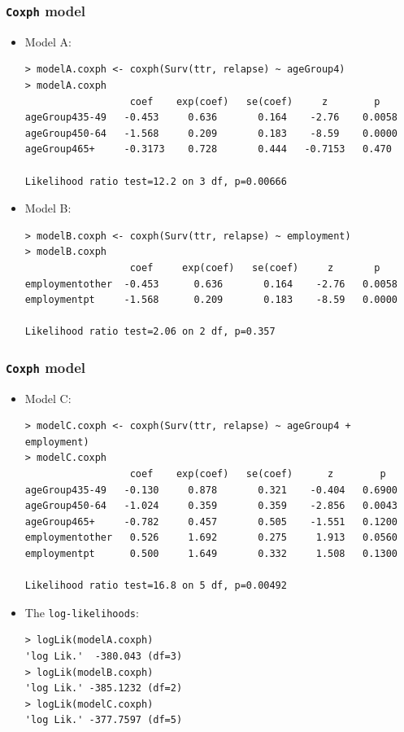 \documentclass{beamer}
\begin{document}
\pagebreak
\begin{frame}[fragile]
\frametitle{\texttt{Coxph} model}	
\begin{itemize}
\item Model A:
\begin{Verbatim}
> modelA.coxph <- coxph(Surv(ttr, relapse) ~ ageGroup4)
> modelA.coxph
                  coef    exp(coef)   se(coef)     z        p 
ageGroup435-49   -0.453     0.636       0.164    -2.76    0.0058
ageGroup450-64   -1.568     0.209       0.183    -8.59    0.0000
ageGroup465+     -0.3173    0.728       0.444   -0.7153   0.470

Likelihood ratio test=12.2 on 3 df, p=0.00666
\end{Verbatim}
\item Model B:
\begin{Verbatim}
> modelB.coxph <- coxph(Surv(ttr, relapse) ~ employment)
> modelB.coxph
                  coef     exp(coef)   se(coef)     z       p 
employmentother  -0.453      0.636       0.164    -2.76   0.0058
employmentpt     -1.568      0.209       0.183    -8.59   0.0000

Likelihood ratio test=2.06 on 2 df, p=0.357
\end{Verbatim}
\end{itemize}
\end{frame}

\pagebreak
\begin{frame}[fragile]
\frametitle{\texttt{Coxph} model}	
\begin{itemize}
\item Model C:
\begin{Verbatim}
> modelC.coxph <- coxph(Surv(ttr, relapse) ~ ageGroup4 +
employment)
> modelC.coxph
                  coef    exp(coef)   se(coef)      z        p 
ageGroup435-49   -0.130     0.878       0.321    -0.404   0.6900
ageGroup450-64   -1.024     0.359       0.359    -2.856   0.0043
ageGroup465+     -0.782     0.457       0.505    -1.551   0.1200
employmentother   0.526     1.692       0.275     1.913   0.0560
employmentpt      0.500     1.649       0.332     1.508   0.1300

Likelihood ratio test=16.8 on 5 df, p=0.00492
\end{Verbatim}
\item The \texttt{log-likelihoods}:
\begin{Verbatim}
> logLik(modelA.coxph) 
'log Lik.'  -380.043 (df=3)
> logLik(modelB.coxph)
'log Lik.' -385.1232 (df=2)
> logLik(modelC.coxph)
'log Lik.' -377.7597 (df=5)
\end{Verbatim}
\end{itemize}
\end{frame}
\end{document}
